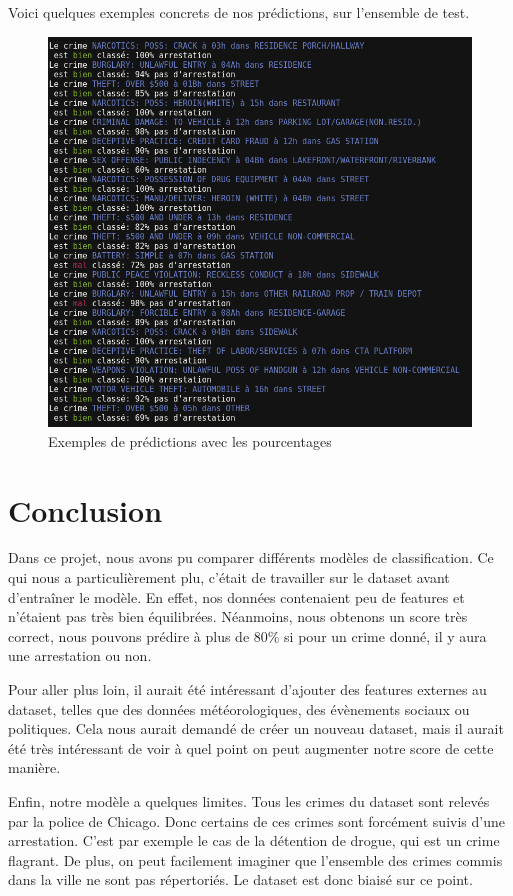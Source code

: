 \documentclass{article}
\begin{document}
    Voici quelques exemples concrets de nos prédictions, sur l'ensemble de test.
    \begin{figure}[H]
	    \centering
	    \includegraphics[scale=.4]{images/results.png}
	    \caption{Exemples de prédictions avec les pourcentages}
    \end{figure}


    \section{Conclusion}
    Dans ce projet, nous avons pu comparer différents modèles de
    classification. 
    Ce qui nous a particulièrement plu, c'était de travailler sur le dataset
    avant d'entraîner le modèle. En effet, nos données contenaient peu de
    features et n'étaient pas très bien équilibrées.
    Néanmoins, nous obtenons un score très correct, nous pouvons prédire à
    plus de 80\% si pour un crime donné, il y aura une arrestation ou non.

    Pour aller plus loin, il aurait été intéressant d'ajouter des features
    externes au dataset, telles que des données météorologiques, des
    évènements sociaux ou politiques. Cela nous aurait demandé de créer un
    nouveau dataset, mais il aurait été très intéressant de voir à quel 
    point on peut augmenter notre score de cette manière.

    Enfin, notre modèle a quelques limites. Tous les crimes du dataset sont
    relevés par la police de Chicago. Donc certains de ces crimes sont
    forcément suivis d'une arrestation. C'est par exemple le cas de la
    détention de drogue, qui est un crime flagrant.
    De plus, on peut facilement imaginer que l'ensemble des crimes commis
    dans la ville ne sont pas répertoriés. Le dataset est donc biaisé sur ce
    point.
\end{document}

